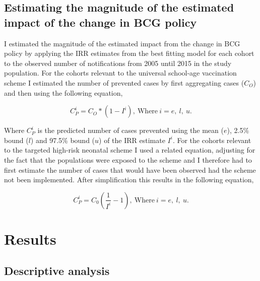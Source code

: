 \documentclass[11pt,twoside]{bristolthesis}
\begin{document}
  \hypertarget{magnitude-estimation}{%
  \subsection{Estimating the magnitude of the estimated impact of the change in BCG policy}\label{magnitude-estimation}}
  
  I estimated the magnitude of the estimated impact from the change in BCG policy by applying the IRR estimates from the best fitting model for each cohort to the observed number of notifications from 2005 until 2015 in the study population. For the cohorts relevant to the universal school-age vaccination scheme I estimated the number of prevented cases by first aggregating cases (\(C_O\)) and then using the following equation,
  
  \[ C^i_P = C_O * (1 - I^i),\ \text{Where}\ i = e,\ l,\ u.\]
  
  Where \(C^i_P\) is the predicted number of cases prevented using the mean (\(e\)), 2.5\% bound (\(l\)) and 97.5\% bound (\(u\)) of the IRR estimate \(I^i\). For the cohorts relevant to the targeted high-risk neonatal scheme I used a related equation, adjusting for the fact that the populations were exposed to the scheme and I therefore had to first estimate the number of cases that would have been observed had the scheme not been implemented. After simplification this results in the following equation,
  
  \[ C^i_P =  C_0\left(\frac{1}{I^i } - 1\right),\ \text{Where}\ i = e,\ l,\ u.\]
  
  \hypertarget{results-1}{%
  \section{Results}\label{results-1}}
  
  \hypertarget{descriptive-analysis}{%
  \subsection{Descriptive analysis}\label{descriptive-analysis}}
  
\end{document}
